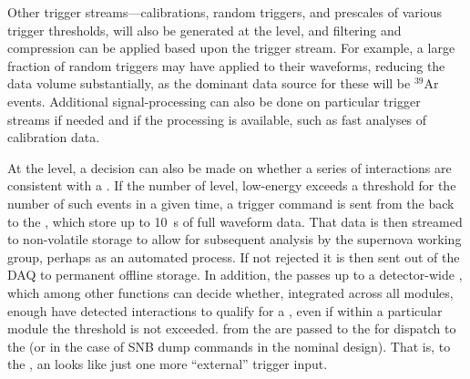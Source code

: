 Other trigger streams---calibrations, random triggers, and prescales
of various trigger thresholds, will also be generated at the
 level, and filtering and compression can be applied
based upon the trigger stream. 
For example, a large fraction of random triggers may have 
applied to their waveforms, reducing the data volume substantially, as
the dominant data source for these will be $^{39}$Ar events.
Additional signal-processing can also be done on particular trigger
streams if needed and if the processing is available, such as fast
analyses of calibration data.

At the  level, a decision can also be made on whether
a series of interactions are consistent with a . 
If the number of  level, low-energy
 exceeds a threshold for the number of such
events in a given time, a trigger command is sent from the 
back to the , which store up to \SI{10}{\s} of full
waveform data. 
That data is then streamed to non-volatile storage to allow for
subsequent analysis by the supernova working group, perhaps as an
automated process. 
If not rejected it is then sent out of the DAQ to permanent offline
storage.
In addition, the  passes  up to a
detector-wide , which among other functions can decide
whether, integrated across all modules, enough  have
detected interactions to qualify for a , even if within a
particular module the threshold is not exceeded. 
 from the  are passed to the
 for dispatch to the  (or  in the
case of SNB dump commands in the nominal design). 
That is, to the , an  looks like just
one more ``external'' trigger input.

